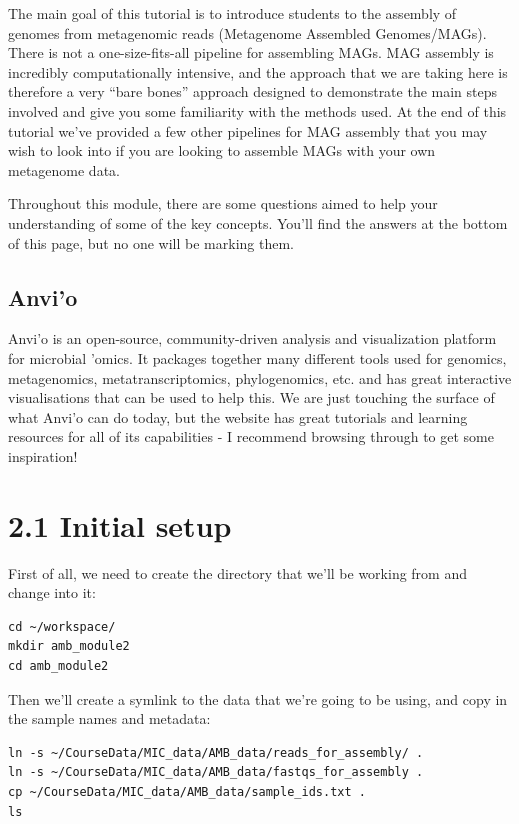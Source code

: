 \documentclass[
]{book}
\begin{document}
The main goal of this tutorial is to introduce students to the assembly of genomes from metagenomic reads (Metagenome Assembled Genomes/MAGs). There is not a one-size-fits-all pipeline for assembling MAGs. MAG assembly is incredibly computationally intensive, and the approach that we are taking here is therefore a very ``bare bones'' approach designed to demonstrate the main steps involved and give you some familiarity with the methods used. At the end of this tutorial we've provided a few other pipelines for MAG assembly that you may wish to look into if you are looking to assemble MAGs with your own metagenome data.

Throughout this module, there are some questions aimed to help your understanding of some of the key concepts. You'll find the answers at the bottom of this page, but no one will be marking them.

\subsection{Anvi'o}\label{anvio}

Anvi'o is an open-source, community-driven analysis and visualization platform for microbial 'omics. It packages together many different tools used for genomics, metagenomics, metatranscriptomics, phylogenomics, etc. and has great interactive visualisations that can be used to help this. We are just touching the surface of what Anvi'o can do today, but the website has great tutorials and learning resources for all of its capabilities - I recommend browsing through to get some inspiration!

\section{2.1 Initial setup}\label{initial-setup}

First of all, we need to create the directory that we'll be working from and change into it:

\begin{verbatim}
cd ~/workspace/
mkdir amb_module2
cd amb_module2
\end{verbatim}

Then we'll create a symlink to the data that we're going to be using, and copy in the sample names and metadata:

\begin{verbatim}
ln -s ~/CourseData/MIC_data/AMB_data/reads_for_assembly/ .
ln -s ~/CourseData/MIC_data/AMB_data/fastqs_for_assembly .
cp ~/CourseData/MIC_data/AMB_data/sample_ids.txt .
ls
\end{verbatim}
\end{document}
